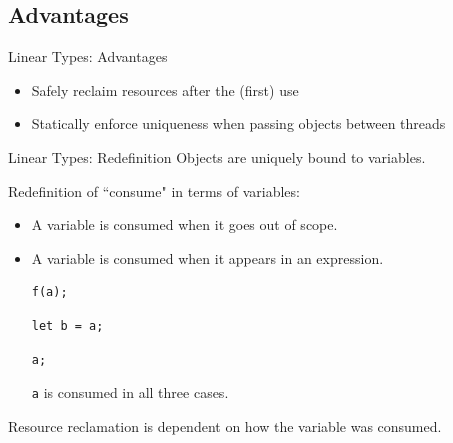 \documentclass[xcolor=x11names,compress]{beamer}
\renewcommand{\(}{\begin{columns}}
\renewcommand{\)}{\end{columns}}
\newcommand{\<}[1]{\begin{column}{#1}}
\renewcommand{\>}{\end{column}}
\begin{document}
\subsection{Advantages}
\begin{frame}{Linear Types: Advantages}
    \begin{itemize}
        \item Safely reclaim resources after the (first) use
        \pause
        \item Statically enforce uniqueness when passing objects between threads
    \end{itemize}
\end{frame}

\begin{frame}[fragile]{Linear Types: Redefinition}
Objects are uniquely bound to variables.
\pause\par
Redefinition of ``consume" in terms of variables:
\begin{itemize}
\item A variable is consumed when it goes out of scope.
\pause
\item A variable is consumed when it appears in an expression.
\begin{lstlisting}
f(a);
\end{lstlisting}
\begin{lstlisting}
let b = a;
\end{lstlisting}
\begin{lstlisting}
a;
\end{lstlisting}
\texttt{a} is consumed in all three cases.
\end{itemize}
\pause
Resource reclamation is dependent on how the variable was consumed.
\end{frame}

\end{document}
